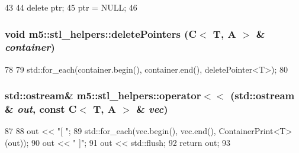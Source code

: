 \begin{DoxyCode}
43 {
44     delete ptr;
45     ptr = NULL;
46 }
\end{DoxyCode}
\hypertarget{namespacem5_1_1stl__helpers_a789891cb80a549639c232ca96afb3fe1}{
\subsubsection[{deletePointers}]{\setlength{\rightskip}{0pt plus 5cm}void m5::stl\_\-helpers::deletePointers (C$<$ T, A $>$ \& {\em container})}}
\label{namespacem5_1_1stl__helpers_a789891cb80a549639c232ca96afb3fe1}



\begin{DoxyCode}
78 {
79     std::for_each(container.begin(), container.end(), deletePointer<T>);
80 }
\end{DoxyCode}
\hypertarget{namespacem5_1_1stl__helpers_acd4af6db82f09f20c07d0055dd78e2eb}{
\subsubsection[{operator$<$$<$}]{\setlength{\rightskip}{0pt plus 5cm}std::ostream\& m5::stl\_\-helpers::operator$<$$<$ (std::ostream \& {\em out}, \/  const C$<$ T, A $>$ \& {\em vec})}}
\label{namespacem5_1_1stl__helpers_acd4af6db82f09f20c07d0055dd78e2eb}



\begin{DoxyCode}
87 {
88     out << "[ ";
89     std::for_each(vec.begin(), vec.end(), ContainerPrint<T>(out));
90     out << " ]";
91     out << std::flush;
92     return out;
93 }
\end{DoxyCode}
